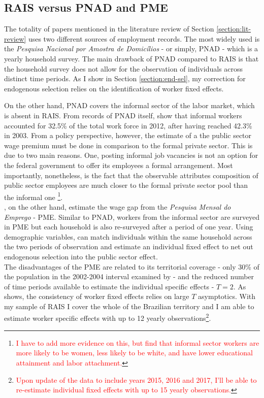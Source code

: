 \documentclass{article}
\begin{document}
\subsection{RAIS versus PNAD and PME}
The totality of papers mentioned in the literature review of Section \ref{section:lit-review} uses two different sources of employment records. The most widely used is the \emph{Pesquisa Nacional por Amostra de Domicílios} - or simply, PNAD - which is a yearly household survey. The main drawback of PNAD compared to RAIS is that the household survey does not allow for the observation of individuals across distinct time periods. As I show in Section \ref{section:end-sel}, my correction for endogenous selection relies on the identification of worker fixed effects. 

On the other hand, PNAD covers the informal sector of the labor market, which is absent in RAIS. From records of PNAD itself, \cite{filho_evolucao_2015} show that informal workers accounted for 32.5\% of the total work force in 2012, after having reached 42.3\% in 2003. From a policy perspective, however, the estimate of a the public sector wage premium must be done in comparison to the formal private sector. This is due to two main reasons. One, posting informal job vacancies is not an option for the federal government to offer its employees a formal arrangement. Most importantly, nonetheless, is the fact that the observable attributes composition of public sector employees are much closer to the formal private sector pool than the informal one \footnote{\textcolor{red}{I have to add more evidence on this, but \cite{corseuil_criterios_2015} find that informal sector workers are more likely to be women, less likely to be white, and have lower educational attainment and labor attachment.}}. \\

\noindent
\cite{emilio_evaluating_2012}, on the other hand, estimate the wage gap from the \emph{Pesquisa Mensal do Emprego} - PME. Similar to PNAD, workers from the informal sector are surveyed in PME but each household is also re-surveyed after a period of one year. Using demographic variables, \cite{emilio_evaluating_2012} can match individuals within the same household across the two periods of observation and estimate an individual fixed effect to net out endogenous selection into the public sector effect. \\

\noindent
The disadvantages of the PME are related to its territorial coverage - only 30\% of the population in the 2002-2004 interval examined by \cite{emilio_evaluating_2012} - and the reduced number of time periods available to estimate the individual specific effects - $T=2$. As \cite{canay_simple_2011} shows, the consistency of worker fixed effects relies on large $T$ asymptotics. With my sample of RAIS I cover the whole of the Brazilian territory and I am able to estimate worker specific effects with up to 12 yearly observations\footnote{\textcolor{red}{Upon update of the data to include years 2015, 2016 and 2017, I'll be able to re-estimate individual fixed effects with up to 15 yearly observations.}}.   
\end{document}
